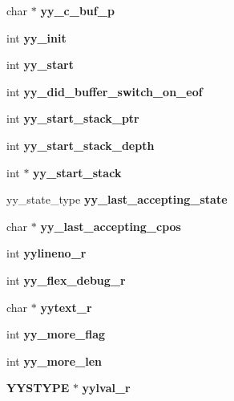 \begin{DoxyCompactItemize}
\item 
char $\ast$ {\bfseries yy\+\_\+c\+\_\+buf\+\_\+p}\label{structyyguts__t_ab1b9bcacb33aab1e02b625512bc0e221}

\item 
int {\bfseries yy\+\_\+init}\label{structyyguts__t_abbef56b2d8359f6a15629c104f5dd030}

\item 
int {\bfseries yy\+\_\+start}\label{structyyguts__t_a8baf7d47fe53035d9bc2a9670795ff01}

\item 
int {\bfseries yy\+\_\+did\+\_\+buffer\+\_\+switch\+\_\+on\+\_\+eof}\label{structyyguts__t_a2daec411627700709ef2fd927e69627d}

\item 
int {\bfseries yy\+\_\+start\+\_\+stack\+\_\+ptr}\label{structyyguts__t_ad9e132dacc2904a8ae76c64c72e33795}

\item 
int {\bfseries yy\+\_\+start\+\_\+stack\+\_\+depth}\label{structyyguts__t_a35bedf1c17debd766565b99c39132eb4}

\item 
int $\ast$ {\bfseries yy\+\_\+start\+\_\+stack}\label{structyyguts__t_af6e2e45a5fdba0f313c680b35da4292a}

\item 
yy\+\_\+state\+\_\+type {\bfseries yy\+\_\+last\+\_\+accepting\+\_\+state}\label{structyyguts__t_a84e01a3658729e9d69f79feb3faf1c99}

\item 
char $\ast$ {\bfseries yy\+\_\+last\+\_\+accepting\+\_\+cpos}\label{structyyguts__t_a46fb8d232ed375921af0b37caeeb67c4}

\item 
int {\bfseries yylineno\+\_\+r}\label{structyyguts__t_aa9f13776b8d311e847cc7d974d49af4c}

\item 
int {\bfseries yy\+\_\+flex\+\_\+debug\+\_\+r}\label{structyyguts__t_a5ad72d75ed6d693824fe7e02ce21118e}

\item 
char $\ast$ {\bfseries yytext\+\_\+r}\label{structyyguts__t_aebaa731ad6cbe2411d104925e5bb3f2c}

\item 
int {\bfseries yy\+\_\+more\+\_\+flag}\label{structyyguts__t_a664a72171cc3e720fcb8120af9b72883}

\item 
int {\bfseries yy\+\_\+more\+\_\+len}\label{structyyguts__t_a683563bf4cd73f25b4c7b78579c1330e}

\item 
{\bf Y\+Y\+S\+T\+Y\+P\+E} $\ast$ {\bfseries yylval\+\_\+r}\label{structyyguts__t_a55dbdcd46a36d34adcbfc29be44d10cf}

\end{DoxyCompactItemize}


